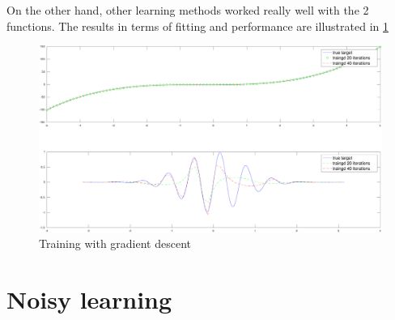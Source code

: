\documentclass[11pt, a4paper]{article}
\begin{document}
On the other hand, other learning methods worked really well with the
2 functions. The results in terms of fitting and performance are
illustrated in \ref{fig:trainll}

\begin{figure}[H]
  \includegraphics[scale=.43]{trainlm.pdf}
  \caption{Training with gradient descent}
  \label{fig:trainll}
\end{figure}

\section{Noisy learning}


 

\end{document}
